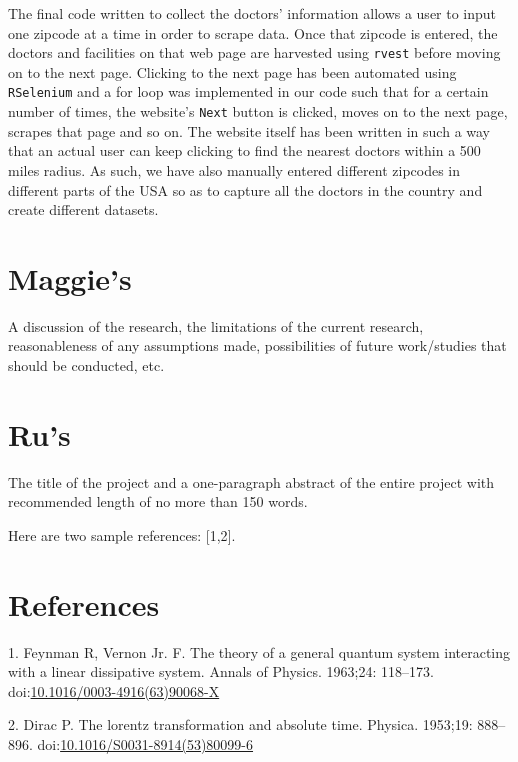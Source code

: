 \documentclass[10pt,letterpaper]{article}
\begin{document}
The final code written to collect the doctors' information allows a user
to input one zipcode at a time in order to scrape data. Once that
zipcode is entered, the doctors and facilities on that web page are
harvested using \texttt{rvest} before moving on to the next page.
Clicking to the next page has been automated using \texttt{RSelenium}
and a for loop was implemented in our code such that for a certain
number of times, the website's \texttt{Next} button is clicked, moves on
to the next page, scrapes that page and so on. The website itself has
been written in such a way that an actual user can keep clicking to find
the nearest doctors within a 500 miles radius. As such, we have also
manually entered different zipcodes in different parts of the USA so as
to capture all the doctors in the country and create different datasets.

\section{Maggie's}\label{maggies-1}

A discussion of the research, the limitations of the current research,
reasonableness of any assumptions made, possibilities of future
work/studies that should be conducted, etc.

\section{Ru's}\label{rus}

The title of the project and a one-paragraph abstract of the entire
project with recommended length of no more than 150 words.

Here are two sample references: {[}1,2{]}.

\section*{References}\label{references}

\hypertarget{refs}{}
\hypertarget{ref-Feynman1963118}{}
1. Feynman R, Vernon Jr. F. The theory of a general quantum system
interacting with a linear dissipative system. Annals of Physics.
1963;24: 118--173.
doi:\href{https://doi.org/10.1016/0003-4916(63)90068-X}{10.1016/0003-4916(63)90068-X}

\hypertarget{ref-Dirac1953888}{}
2. Dirac P. The lorentz transformation and absolute time. Physica.
1953;19: 888--896.
doi:\href{https://doi.org/10.1016/S0031-8914(53)80099-6}{10.1016/S0031-8914(53)80099-6}

\nolinenumbers
\end{document}
